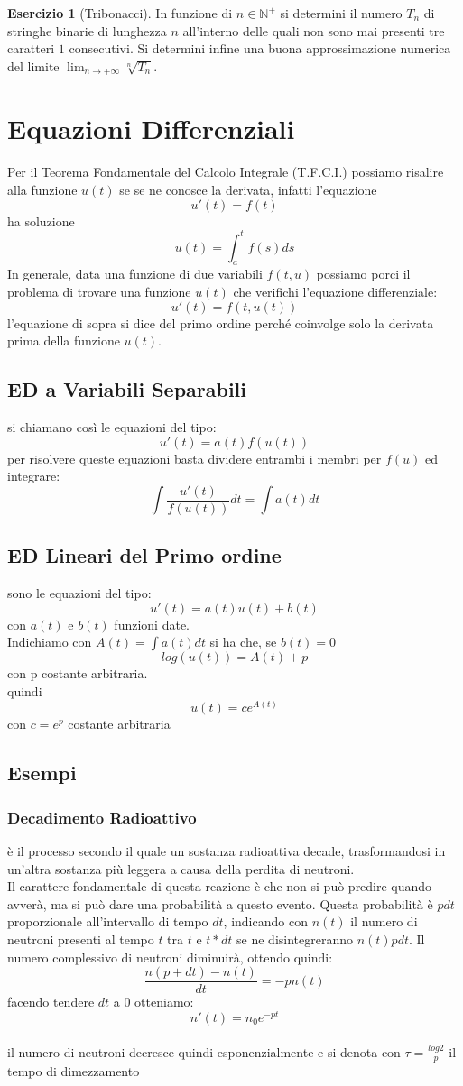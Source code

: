 \documentclass[a4paper,twoside]{article}
\newcommand{\N}{\mathbb{N}}
\theoremstyle{definition}
\newtheorem{ex}[theorem]{Esercizio}
\numberwithin{theorem}{section}
\begin{document}
\begin{ex}[Tribonacci] In funzione di $n\in\N^+$ si determini il numero $T_n$ di stringhe binarie di lunghezza $n$ all'interno delle quali non sono mai presenti tre caratteri $1$ consecutivi. Si determini infine una buona approssimazione numerica del limite $\lim_{n\to +\infty}\sqrt[n]{T_n}$.
 
\end{ex}



\newpage

\section{Equazioni Differenziali}
Per il Teorema Fondamentale del Calcolo Integrale (T.F.C.I.) possiamo risalire alla funzione $u(t)$ se se ne conosce la derivata, infatti l'equazione $$u'(t)=f(t)$$ ha soluzione $$u(t)=\int_{a}^{t}f(s)ds$$
In generale, data una funzione di due variabili $f(t,u)$ possiamo porci il problema di trovare una funzione $u(t)$ che verifichi l'equazione differenziale:$$u'(t)=f(t,u(t))$$
l'equazione di sopra si dice del primo ordine perché coinvolge solo la derivata prima della funzione $u(t)$.
\subsection{ED a Variabili Separabili}
si chiamano così le equazioni del tipo: $$u'(t)=a(t)f(u(t))$$ per risolvere queste equazioni basta dividere entrambi i membri per $f(u)$ ed integrare: $$\int\frac{u'(t)}{f(u(t))}dt=\int a(t)dt$$
\subsection{ED Lineari del Primo ordine}
sono le equazioni del tipo: $$u'(t)=a(t)u(t)+b(t)$$
con $a(t)$ e $b(t)$ funzioni date.\\
Indichiamo con $A(t)=\int a(t)dt$ si ha che, se $b(t)=0$ $$log(u(t))=A(t)+p$$ con p costante arbitraria.\\
quindi $$u(t)= ce^{A(t)}$$
con $c=e^p$ costante arbitraria
\subsection{Esempi}
\subsubsection{Decadimento Radioattivo}
è il processo secondo il quale un sostanza radioattiva decade, trasformandosi in un'altra sostanza più leggera a causa della perdita di neutroni.\\
Il carattere fondamentale di questa reazione è che non si può predire quando avverà, ma si può dare una probabilità a questo evento. Questa probabilità è $pdt$ proporzionale all'intervallo di tempo $dt$, indicando con $n(t)$ il numero di neutroni presenti al tempo $t$ tra $t$ e $t*dt$ se ne disintegreranno $n(t)pdt$. Il numero complessivo di neutroni diminuirà, ottendo quindi:$$\frac{n(p+dt)-n(t)}{dt}=-pn(t)$$
facendo tendere $dt$ a $0$ otteniamo: $$n'(t)=n_0e^{-pt}$$\\
il numero di neutroni decresce quindi esponenzialmente e si denota con $\tau=\frac{log2}{p}$ il tempo di dimezzamento
\end{document}
